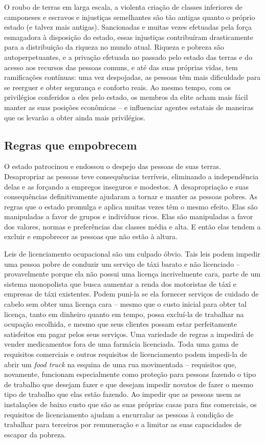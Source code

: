 O roubo de terras em larga escala, a violenta criação de classes inferiores de camponeses e escravos e injustiças semelhantes são tão antigas quanto o próprio estado (e talvez mais antigas). Sancionadas e muitas vezes efetuadas pela força esmagadora à disposição do estado, essas injustiças contribuíram drasticamente para a distribuição da riqueza no mundo atual. Riqueza e pobreza são autoperpetuantes, e a privação efetuada no passado pelo estado das terras e do acesso aos recursos das pessoas comuns, e até das suas próprias vidas, tem ramificações contínuas: uma vez despojadas, as pessoas têm mais dificuldade para se reerguer e obter segurança e conforto reais. Ao mesmo tempo, com os privilégios conferidos a eles pelo estado, os membros da elite acham mais fácil manter as suas posições econômicas -- e influenciar agentes estatais de maneiras que os levarão a obter ainda mais privilégios.

\subsection*{Regras que empobrecem}

O estado patrocinou e endossou o despejo das pessoas de suas terras. Desapropriar as pessoas teve consequências terríveis, eliminando a independência delas e as forçando a empregos inseguros e modestos. A desapropriação e suas consequências definitivamente ajudaram a tornar e manter as pessoas pobres. As regras que o estado promulga e aplica muitas vezes têm o mesmo efeito. Elas são manipuladas a favor de grupos e indivíduos ricos. Elas são manipuladas a favor dos valores, normas e preferências das classes média e alta. E então elas tendem a excluir e empobrecer as pessoas que não estão à altura.

Leis de licenciamento ocupacional são um culpado óbvio. Tais leis podem impedir uma pessoa pobre de conduzir um serviço de táxi barato e não licenciado -- provavelmente porque ela não possui uma licença incrivelmente cara, parte de um sistema monopolista que busca aumentar a renda dos motoristas de táxi e empresas de táxi existentes. Podem puni-la se ela fornecer serviços de cuidado de cabelo sem obter uma licença cara -- mesmo que o custo inicial para obter tal licença, tanto em dinheiro quanto em tempo, possa excluí-la de trabalhar na ocupação escolhida, e mesmo que seus clientes possam estar perfeitamente satisfeitos em pagar pelos seus serviços. Uma variedade de regras a impedirá de vender medicamentos fora de uma farmácia licenciada. Toda uma gama de requisitos comerciais e outros requisitos de licenciamento podem impedi-la de abrir um \emph{food truck} na esquina de uma rua movimentada -- requisitos que, novamente, funcionam especialmente como proteção para pessoas fazendo o tipo de trabalho que desejam fazer e que desejam impedir novatos de fazer o mesmo tipo de trabalho que elas estão fazendo. Ao impedir que as pessoas usem as instalações de baixo custo que são as suas próprias casas para fins comerciais, os requisitos de licenciamento ajudam a encurralar as pessoas à condição de trabalhar para terceiros por remuneração e a limitar as suas capacidades de escapar da pobreza.

